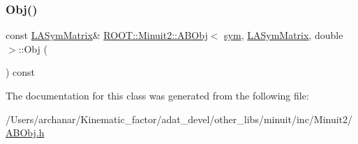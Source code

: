 \mbox{\label{classROOT_1_1Minuit2_1_1ABObj_3_01sym_00_01LASymMatrix_00_01double_01_4_a8caec6ce565f8d3729c663088d40233e}} 
\subsubsection{\texorpdfstring{Obj()}{Obj()}\hspace{0.1cm}{\footnotesize\ttfamily [2/2]}}
{\footnotesize\ttfamily const \mbox{\hyperlink{classROOT_1_1Minuit2_1_1LASymMatrix}{L\+A\+Sym\+Matrix}}\& \mbox{\hyperlink{classROOT_1_1Minuit2_1_1ABObj}{R\+O\+O\+T\+::\+Minuit2\+::\+A\+B\+Obj}}$<$ \mbox{\hyperlink{classROOT_1_1Minuit2_1_1sym}{sym}}, \mbox{\hyperlink{classROOT_1_1Minuit2_1_1LASymMatrix}{L\+A\+Sym\+Matrix}}, double $>$\+::Obj (\begin{DoxyParamCaption}{ }\end{DoxyParamCaption}) const\hspace{0.3cm}{\ttfamily [inline]}}



The documentation for this class was generated from the following file\+:\begin{DoxyCompactItemize}
\item 
/\+Users/archanar/\+Kinematic\+\_\+factor/adat\+\_\+devel/other\+\_\+libs/minuit/inc/\+Minuit2/\mbox{\hyperlink{other__libs_2minuit_2inc_2Minuit2_2ABObj_8h}{A\+B\+Obj.\+h}}\end{DoxyCompactItemize}
